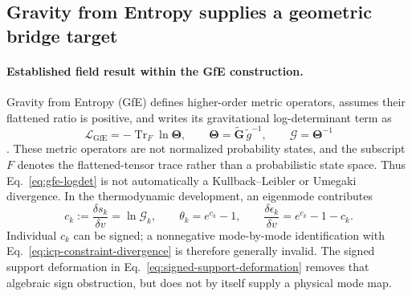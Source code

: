 \subsection{Gravity from Entropy supplies a geometric bridge target}

\paragraph{Established field result within the GfE construction.}
Gravity from Entropy (GfE) defines higher-order metric operators, assumes their
flattened ratio is positive, and writes its gravitational log-determinant term as
\begin{equation}
 \mathcal L_{\mathrm{GfE}}
 =-\operatorname{Tr}_{F}\ln\boldsymbol\Theta,
 \qquad
 \boldsymbol\Theta=\widetilde{\mathbf G}\,\widetilde g^{-1},
 \qquad
 \boldsymbol{\mathcal G}=\boldsymbol\Theta^{-1}
 \label{eq:gfe-logdet}
\end{equation}
\citep{Bianconi2025Gravity,Bianconi2026Thermodynamics}. These metric operators
are not normalized probability states, and the subscript $F$ denotes the
flattened-tensor trace rather than a probabilistic state space. Thus
Eq.~\eqref{eq:gfe-logdet} is not automatically a Kullback--Leibler or Umegaki
divergence. In the thermodynamic development, an eigenmode contributes
\begin{equation}
 c_k:=\frac{\delta s_k}{\delta v}=\ln\mathcal G_k,
 \qquad
 \theta_k=e^{c_k}-1,
 \qquad
 \frac{\delta\epsilon_k}{\delta v}=e^{c_k}-1-c_k.
 \label{eq:gfe-thermodynamics}
\end{equation}
Individual $c_k$ can be signed; a nonnegative mode-by-mode identification with
Eq.~\eqref{eq:icp-constraint-divergence} is therefore generally invalid. The
signed support deformation in Eq.~\eqref{eq:signed-support-deformation} removes
that algebraic sign obstruction, but does not by itself supply a physical mode
map.

